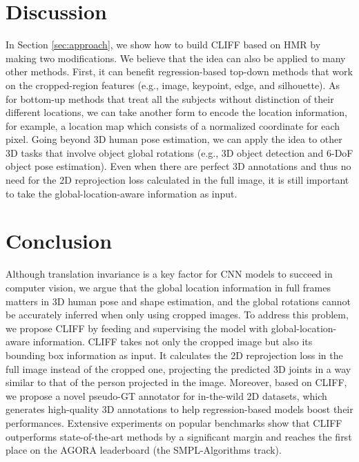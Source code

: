 \documentclass[runningheads]{llncs}
\begin{document}
\section{Discussion}
In Section \ref{sec:approach}, we show how to build CLIFF based on HMR by making two modifications.
We believe that the idea can also be applied to many other methods.
First, it can benefit regression-based top-down methods that work on the cropped-region features (e.g., image, keypoint, edge, and silhouette).
As for bottom-up methods that treat all the subjects without distinction of their different locations, we can take another form to encode the location information, for example, a location map which consists of a normalized coordinate for each pixel.
Going beyond 3D human pose estimation, we can apply the idea to other 3D tasks that involve object global rotations (e.g., 3D object detection and 6-DoF object pose estimation).
Even when there are perfect 3D annotations and thus no need for the 2D reprojection loss calculated in the full image, it is still important to take the global-location-aware information as input.

\section{Conclusion}

Although translation invariance is a key factor for CNN models to succeed in computer vision, we argue that the global location information in full frames matters in 3D human pose and shape estimation, and the global rotations cannot be accurately inferred when only using cropped images.
To address this problem, we propose CLIFF by feeding and supervising the model with global-location-aware information.
CLIFF takes not only the cropped image but also its bounding box information as input.
It calculates the 2D reprojection loss in the full image instead of the cropped one, projecting the predicted 3D joints in a way similar to that of the person projected in the image.
Moreover, based on CLIFF, we propose a novel pseudo-GT annotator for in-the-wild 2D datasets, which generates high-quality 3D annotations to help regression-based models boost their performances.
Extensive experiments on popular benchmarks show that CLIFF outperforms state-of-the-art methods by a significant margin and reaches the first place on the AGORA leaderboard (the SMPL-Algorithms track).

\clearpage



\end{document}
